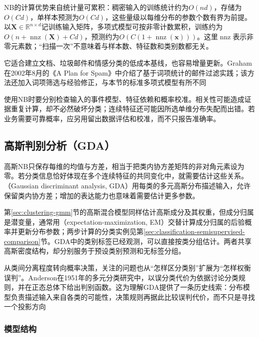 NB的计算优势来自统计量可累积：稠密输入的训练统计约为$O(nd)$，存储为$O(Cd)$，单样本预测为$O(Cd)$，这些量级以每维分布的参数个数有界为前提。以$\bm{X}\in\mathbb{R}^{n\times d}$记训练输入矩阵，多项式模型可按非零计数累积，训练约为$O(n+\operatorname{nnz}(\bm{X})+Cd)$，预测约为$O(C(1+\operatorname{nnz}(\bm{x})))$。这里$\operatorname{nnz}$表示非零元素数；“扫描一次”不意味着与样本数、特征数和类别数都无关。

它适合建立文档、垃圾邮件和情感分类的低成本基线，也容易增量更新。Graham在2002年8月的《A Plan for Spam》中介绍了基于词项统计的邮件过滤实践；该方法还加入词项筛选与经验修正，与本节的标准多项式模型有所不同

使用NB时要分别检查输入的事件模型、特征依赖和概率校准。相关性可能造成证据重复计算，却不必然破坏分类；连续特征还可能因所选单维分布失配而出错。若业务需要可靠概率，应另用留出数据评估和校准，而不只报告准确率。

\subsection{高斯判别分析（GDA）}
\label{sec:classification-gda}

高斯NB只保存每维的均值与方差，相当于把类内协方差矩阵的非对角元素设为零。若分类信息恰好体现在多个连续特征的共同变化中，就需要估计这些关系。（Gaussian discriminant analysis, GDA）用每类的多元高斯分布描述输入，允许保留类内协方差；增加的表达能力也意味着需要估计更多参数。

第\ref{sec:clustering-gmm}节的高斯混合模型同样估计高斯成分及其权重，但成分归属是潜变量，通常用（expectation-maximization, EM）交替计算成分归属的后验概率并更新分布参数；两步计算的分类实例见第\ref{sec:classification-semisupervised-comparison}节。GDA中的类别标签已经观测，可以直接按类分组估计。两者共享高斯密度结构，却分别服务于预设类别预测和无标签分组。

从类间分离程度转向概率决策，关注的问题也从“怎样区分类别”扩展为“怎样权衡误判”。Anderson在1951年的多元分类研究中，以误分类代价为依据讨论分类规则，并在正态总体下给出判别函数。这为理解GDA提供了一条历史线索：分布模型负责描述输入来自各类的可能性，决策规则再据此比较误判代价，而不只是寻找一个投影方向

\subsubsection{模型结构}
\label{sec:classification-gda-structure}

